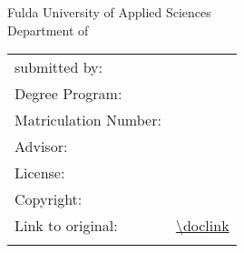 \begin{titlepage}
	\begin{center}
		\huge{\sffamily\textbf{\doctitle}}\\[8ex] %
		\Large{\textbf{\docworktype}}\\[1.5ex] %
		\Large{Fulda University of Applied Sciences}\\
		\Large{Department of \docdepartment}\\[11ex]
		\normalsize
		\begin{table}[H]
			\centering
			\begin{tabular}{ll}
				submitted by:  & \quad \docauthor\\[1.2ex]
				Degree Program: & \quad \docdegreeprogramm\\[1.2ex]
				Matriculation Number: & \quad \docmatriculationnumber\\[1.2ex]
				Advisor:  & \quad \docadvisor\\[8ex] %
				License:  & \quad \doclicense\\[1.2ex]
				Copyright:  & \quad \doccopyright\\[1.2ex]
				Link to original:  & \quad \url{\doclink}\\[1.2ex]
				\\[26ex]
			\end{tabular}
		\end{table}
		\docdate %
	\end{center}
\end{titlepage}
%